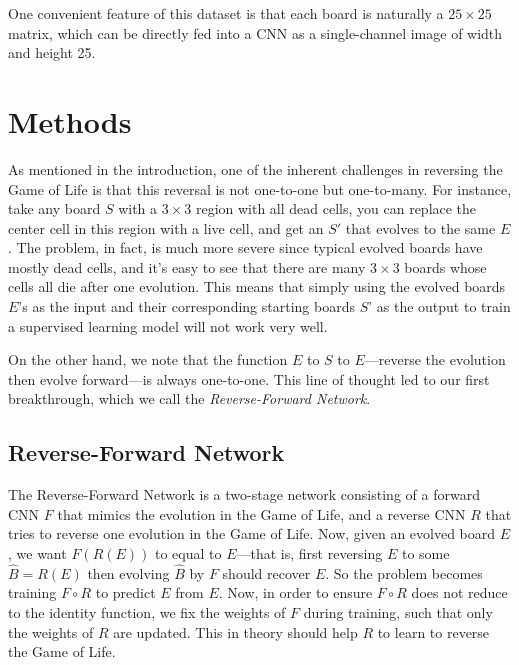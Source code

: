 \documentclass[conference]{IEEEtran}
\begin{document}
One convenient feature of this dataset is that each board is naturally a $25 \times 25$ matrix, which can be directly fed into a CNN as a single-channel image of width and height 25.

\section{Methods}
As mentioned in the introduction, one of the inherent challenges in reversing the Game of Life is that this reversal is not one-to-one but one-to-many. For instance, take any board $S$ with a $3 \times 3$ region with all dead cells, you can replace the center cell in this region with a live cell, and get an $S'$ that evolves to the same $E$. The problem, in fact, is much more severe since typical evolved boards have mostly dead cells, and it's easy to see that there are many $3 \times 3$ boards whose cells all die after one evolution. This means that simply using the evolved boards $E$'s as the input and their corresponding starting boards $S$' as the output to train a supervised learning model will not work very well.

On the other hand, we note that the function $E$ to $S$ to $E$---reverse the evolution then evolve forward---is always one-to-one. This line of thought led to our first breakthrough, which we call the \emph{Reverse-Forward Network}.

\subsection{Reverse-Forward Network}
\label{revfwdnet}
The Reverse-Forward Network is a two-stage network consisting of a forward CNN $F$ that mimics the evolution in the Game of Life, and a reverse CNN $R$ that tries to reverse one evolution in the Game of Life. Now, given an evolved board $E$, we want $F(R(E))$ to equal to $E$---that is, first reversing $E$ to some $\hat B = R(E)$ then evolving $\hat B$ by $F$ should recover $E$. So the problem becomes training $F \circ R$ to predict $E$ from $E$. Now, in order to ensure $F \circ R$ does not reduce to the identity function, we fix the weights of $F$ during training, such that only the weights of $R$ are updated. This in theory should help $R$ to learn to reverse the Game of Life.
\end{document}
